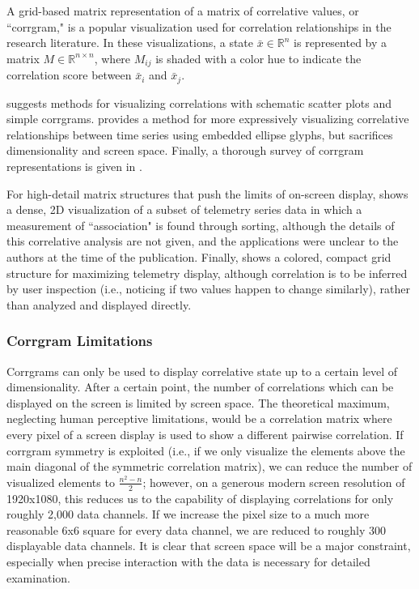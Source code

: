 A grid-based matrix representation of a matrix of correlative values, or ``corrgram," is a popular visualization used for correlation relationships in the research literature. In these visualizations, a state $\bar{x} \in \mathbb{R}^{n}$ is represented by a matrix $M \in \mathbb{R}^{n \times n}$, where $M_{ij}$ is shaded with a color hue to indicate the correlation score between $\bar{x}_{i}$ and $\bar{x}_{j}$.

\cite{yeh2007exploratory} suggests methods for visualizing correlations with schematic scatter plots and simple corrgrams. \cite{murdoch1996graphical} provides a method for more expressively visualizing correlative relationships between time series using embedded ellipse glyphs, but sacrifices dimensionality and screen space. Finally, a thorough survey of corrgram representations is given in \cite{friendly2002corrgrams}. 

For high-detail matrix structures that push the limits of on-screen display, \cite{yairi1992telemetry} shows a dense, 2D visualization of a subset of telemetry series data in which a measurement of ``association" is found through sorting, although the details of this correlative analysis are not given, and the applications were unclear to the authors at the time of the publication. Finally, \cite{cancro2007interactive} shows a colored, compact grid structure for maximizing telemetry display, although correlation is to be inferred by user inspection (i.e., noticing if two values happen to change similarly), rather than analyzed and displayed directly.

\subsubsection{Corrgram Limitations}

Corrgrams can only be used to display correlative state up to a certain level of dimensionality. After a certain point, the number of correlations which can be displayed on the screen is limited by screen space. The theoretical maximum, neglecting human perceptive limitations, would be a correlation matrix where every pixel of a screen display is used to show a different pairwise correlation. If corrgram symmetry is exploited (i.e., if we only visualize the elements above the main diagonal of the symmetric correlation matrix), we can reduce the number of visualized elements to $\frac{n^{2} - n}{2}$; however, on a generous modern screen resolution of 1920x1080, this reduces us to the capability of displaying correlations for only roughly 2,000 data channels. If we increase the pixel size to a much more reasonable 6x6 square for every data channel, we are reduced to roughly 300 displayable data channels. It is clear that screen space will be a major constraint, especially when precise interaction with the data is necessary for detailed examination.

